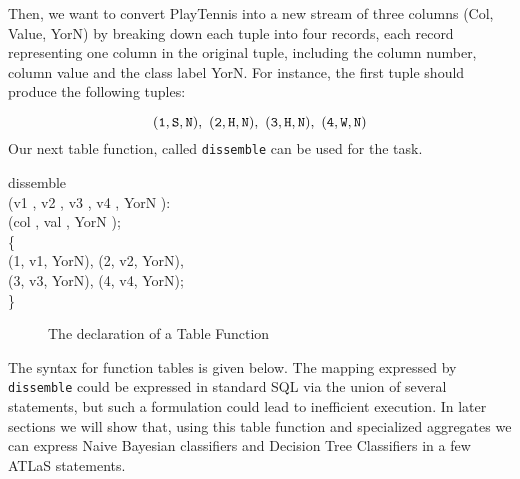 Then, we want to convert {\bw PlayTennis} into a new
stream of three columns {\bw (Col, Value, YorN)} by breaking down each
tuple into four records, each record representing one column in the
original tuple, including the column number, column value and the
class label {\bw YorN}. For instance, the first tuple should
produce the following
tuples:

$$\tt
(1, S, N), \ (2, H, N), \ (3, H, N), \ (4, W, N)$$
Our next table function, called
{\tt dissemble}  can be used for the task.

\begin{codedisplay}
 dissemble\\
\> \>(v1 , v2 , v3 ,
v4 , YorN ):\\
\> \>  \> \> \> \> \> \>\hspace{2cm}  (col , val , YorN ); \\
\> \{  \\
 \> \> \>  (1, v1, YorN), (2, v2, YorN),\\
  \> \> \> \> \> \>\kw{}(3, v3, YorN), (4, v4, YorN);\\
 \> \> \}\\
\end{codedisplay}

\begin{figure}[hbt]
\centering
{}
\caption{The declaration of a Table Function}
\end{figure}
The syntax for function tables is given below.
 The mapping expressed by {\tt dissemble} could be expressed in standard
 SQL via the union of several statements, but such a formulation could
 lead to inefficient execution. In later sections we will show that,
using this table function and specialized aggregates we can
express Naive Bayesian classifiers and Decision Tree Classifiers in
a few ATLaS statements.
